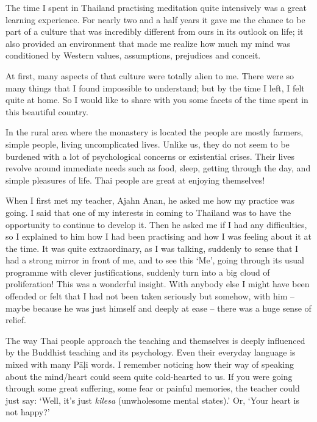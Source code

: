 

The time I spent in Thailand practising meditation quite intensively was a great learning experience. For nearly two and a half years it gave me the chance to be part of a culture that was incredibly different from ours in its outlook on life; it also provided an environment that made me realize how much my mind was conditioned by Western values, assumptions, prejudices and conceit.

At first, many aspects of that culture were totally alien to me. There were so many things that I found impossible to understand; but by the time I left, I felt quite at home. So I would like to share with you some facets of the time spent in this beautiful country.

In the rural area where the monastery is located the people are mostly farmers, simple people, living uncomplicated lives. Unlike us, they do not seem to be burdened with a lot of psychological concerns or existential crises. Their lives revolve around immediate needs such as food, sleep, getting through the day, and simple pleasures of life. Thai people are great at enjoying themselves!

When I first met my teacher, Ajahn Anan, he asked me how my practice was going. I said that one of my interests in coming to Thailand was to have the opportunity to continue to develop it. Then he asked me if I had any difficulties, so I explained to him how I had been practising and how I was feeling about it at the time. It was quite extraordinary, as I was talking, suddenly to sense that I had a strong mirror in front of me, and to see this `Me', going through its usual programme with clever justifications, suddenly turn into a big cloud of proliferation! This was a wonderful insight. With anybody else I might have been offended or felt that I had not been taken seriously but somehow, with him -- maybe because he was just himself and deeply at ease -- there was a huge sense of relief.

The way Thai people approach the teaching and themselves is deeply influenced by the Buddhist teaching and its psychology. Even their everyday language is mixed with many P\=a\d{l}i words. I remember noticing how their way of speaking about the mind/heart could seem quite cold-hearted to us. If you were going through some great suffering, some fear or painful memories, the teacher could just say: `Well, it's just \textit{kilesa} (unwholesome mental states).' Or, `Your heart is not happy?'

